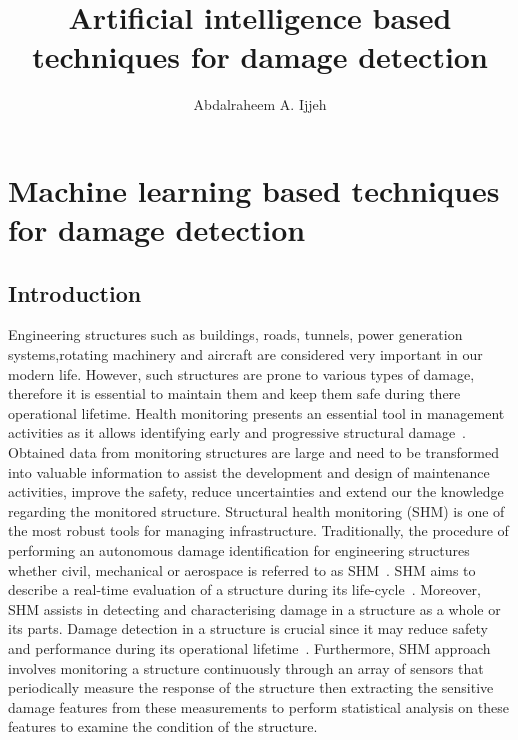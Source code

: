 \documentclass[b5paper, 11pt, openany, titlepage]{book}
\begin{document}


\title{Artificial intelligence based techniques for damage detection}
\author{Abdalraheem A. Ijjeh}
\maketitle
\tableofcontents
\chapter[AI techniques for damage detection]{Machine learning based techniques for damage detection}
\section{Introduction}
Engineering structures such as buildings, roads, tunnels, power generation systems,rotating machinery and aircraft are considered very important in our modern life.
However, such structures are prone to various types of damage, therefore it is essential to maintain them and keep them safe during there operational lifetime.
Health monitoring presents an essential tool in management activities as it allows identifying early and progressive structural damage~\cite{farrar2007introduction}. 
Obtained data from monitoring structures are large and need to be transformed into valuable information to assist the development and design of maintenance activities, improve the safety, reduce uncertainties and extend our the knowledge regarding the monitored structure.
Structural health monitoring (SHM) is one of the most robust
tools for managing infrastructure.
Traditionally, the procedure of performing an autonomous damage identification for engineering structures whether civil, mechanical or aerospace is referred to as SHM~\cite{farrar2001vibration}.
SHM aims to describe a real-time evaluation of a structure during its life-cycle~\cite{Balageas2010}. 
Moreover, SHM assists in detecting and characterising damage in a structure as a whole or its parts. 
Damage detection in a structure is crucial since it may reduce safety and performance during its operational lifetime~\cite{Yuan2016}.
Furthermore, SHM approach involves monitoring a structure continuously through an array of sensors that periodically measure the response of the structure then extracting the sensitive damage features from these measurements to perform statistical analysis on these features to examine the condition of the structure.
\end{document}

